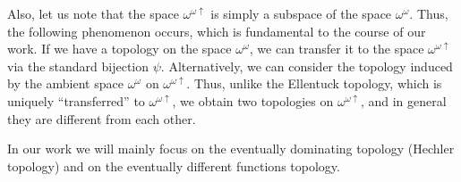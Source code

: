 \documentclass[12pt]{amsart}
\theoremstyle{plain}
\newtheorem{question}[theorem]{Question}
\theoremstyle{definition}
\theoremstyle{remark}
\newcommand{\baire}{\omega^{\omega}}
\newcommand{\incrbaire}{\omega^{\omega \uparrow}}
\begin{document}
Also, let us note that the space $\incrbaire$
is simply a subspace of the space $\baire$.
Thus, the following phenomenon occurs, which is fundamental to the course of our work.
If we have a topology on the space $\baire$,
we can transfer it to the space $\incrbaire$ via the
standard bijection $\psi$. 
Alternatively, we can consider the topology induced by the ambient space $\baire$ on $\incrbaire$.
Thus, unlike the Ellentuck topology, which is uniquely ``transferred''
to $\incrbaire$, we obtain two topologies on $\incrbaire$,
and in general they are different from each other.

In our work we will mainly focus on the
eventually dominating topology (Hechler topology) and on
the eventually different functions topology.

\end{document}
